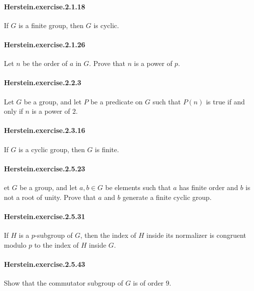 \documentclass{article}
\begin{document}
\paragraph{Herstein.exercise.2.1.18} If $G$ is a finite group, then $G$ is cyclic.

\paragraph{Herstein.exercise.2.1.26} Let $n$ be the order of $a$ in $G$. Prove that $n$ is a power of $p$.

\paragraph{Herstein.exercise.2.2.3} Let $G$ be a group, and let $P$ be a predicate on $G$ such that $P(n)$ is true if and only if $n$ is a power of $2$.


\paragraph{Herstein.exercise.2.3.16} If $G$ is a cyclic group, then $G$ is finite.

\paragraph{Herstein.exercise.2.5.23} et $G$ be a group, and let $a, b \in G$ be elements such that $a$ has finite order and $b$ is not a root of unity. Prove that $a$ and $b$ generate a finite cyclic group.

\paragraph{Herstein.exercise.2.5.31} If $H$ is a $p$-subgroup of $G$, then the index of $H$ inside its normalizer is congruent modulo $p$ to the index of $H$ inside $G$.

\paragraph{Herstein.exercise.2.5.43} Show that the commutator subgroup of $G$ is of order $9$.
\end{document}

